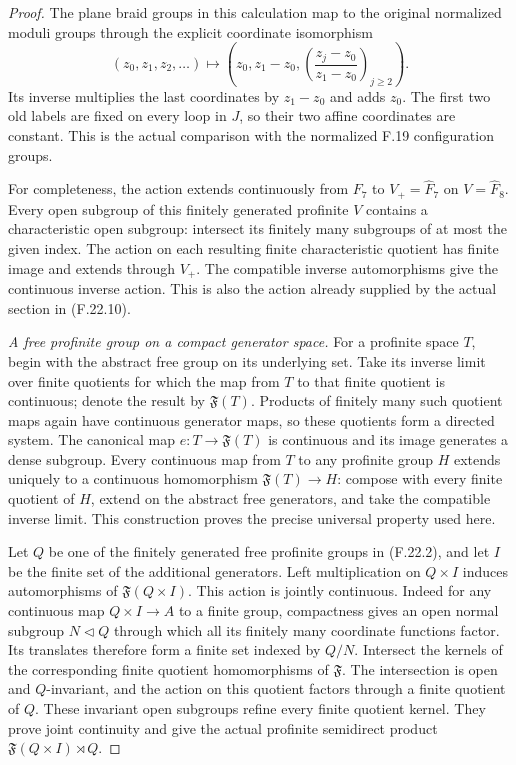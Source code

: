 \begin{proof}
The plane braid groups in this calculation map
to the original normalized moduli groups through
the explicit coordinate isomorphism
\[
 (z_0,z_1,z_2,\ldots)
   \longmapsto
 \left(z_0,z_1-z_0,
           \left(\frac{z_j-z_0}{z_1-z_0}\right)_{j\geq2}\right).
                                                               \tag{F.22.14}
\]
Its inverse multiplies the last coordinates by
$z_1-z_0$ and adds $z_0$. The first two old labels
are fixed on every loop in $J$, so their two
affine coordinates are constant. This is the
actual comparison with the normalized F.19
configuration groups.

For completeness, the action extends continuously
from $F_7$ to $V_+=\widehat F_7$ on $V=\widehat F_8$.
Every open subgroup of this finitely generated
profinite $V$ contains a characteristic open
subgroup: intersect its finitely many subgroups
of at most the given index. The action on each
resulting finite characteristic quotient has
finite image and extends through $V_+$.
The compatible inverse automorphisms give the
continuous inverse action. This is also the
action already supplied by the actual section
in (F.22.10).

\emph{A free profinite group on a compact generator space.}
For a profinite space $T$, begin with the abstract
free group on its underlying set. Take its inverse
limit over finite quotients for which the map
from $T$ to that finite quotient is continuous;
denote the result by $\mathfrak F(T)$.
Products of finitely many such quotient maps again
have continuous generator maps, so these quotients
form a directed system. The canonical map
$e:T\to\mathfrak F(T)$ is continuous and its
image generates a dense subgroup. Every continuous
map from $T$ to any profinite group $H$ extends
uniquely to a continuous homomorphism
$\mathfrak F(T)\to H$: compose with every finite
quotient of $H$, extend on the abstract free
generators, and take the compatible inverse limit.
This construction proves the precise universal
property used here.

Let $Q$ be one of the finitely generated free
profinite groups in (F.22.2), and let $I$ be the
finite set of the additional generators.
Left multiplication on $Q\times I$ induces
automorphisms of $\mathfrak F(Q\times I)$.
This action is jointly continuous. Indeed for
any continuous map $Q\times I\to A$ to a finite
group, compactness gives an open normal subgroup
$N\triangleleft Q$ through which all its finitely
many coordinate functions factor. Its translates
therefore form a finite set indexed by $Q/N$.
Intersect the kernels of the corresponding
finite quotient homomorphisms of $\mathfrak F$.
The intersection is open and $Q$-invariant, and
the action on this quotient factors through a
finite quotient of $Q$. These invariant open
subgroups refine every finite quotient kernel.
They prove joint continuity and give the actual
profinite semidirect product
$\mathfrak F(Q\times I)\rtimes Q$.


\end{proof}
